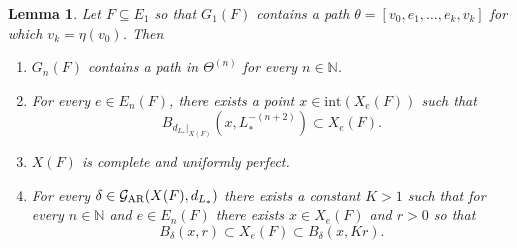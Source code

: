\documentclass{amsart}
\newcommand{\AR}{{\rm AR}}
\newtheorem{lemma}[equation]{Lemma}
\numberwithin{equation}{section}
\theoremstyle{definition}
\theoremstyle{remark}
\newcommand{\N}{\mathbb{N}}
\newcommand{\cG}{\mathcal{G}}
\begin{document}
\begin{lemma}\label{Lemma: Subset Lemma}
    Let \(F\subseteq E_1\) so that \(G_1(F)\) contains a path \(\theta=[v_0,e_1,\ldots,e_k,v_k]\) for which \(v_k=\eta(v_0)\). Then 
        \begin{enumerate}
            \item\label{Lemma: Subset Lemma (1)} \(G_n(F)\) contains a path in \(\Theta^{(n)}\) for every \(n\in\N\).
            \item\label{Lemma: Subset Lemma (2)} For every \(e\in E_n(F)\), there exists a point \(x\in \mathrm{int}(X_e(F))\) such that
                \[
                    B_{d_{L_*}\vert_{{X(F)}}}(x,L_*^{-(n+2)})\subset X_e(F).
                \]
            \item\label{Lemma: Subset Lemma (3)} \(X(F)\) is complete and uniformly perfect.
            \item\label{Lemma: Subset Lemma (4)} For every \(\delta\in\cG_\AR(X(F),d_{L_*})\) there exists a constant \(K>1\) such that for every \(n\in\N\) and \(e\in E_n(F)\) there exists \(x\in X_e(F)\) and \(r>0\) so that
                \[
                    B_\delta(x,r)\subset X_e(F)\subset B_\delta(x,Kr).
                \]
        \end{enumerate}
\end{lemma}
\end{document}
